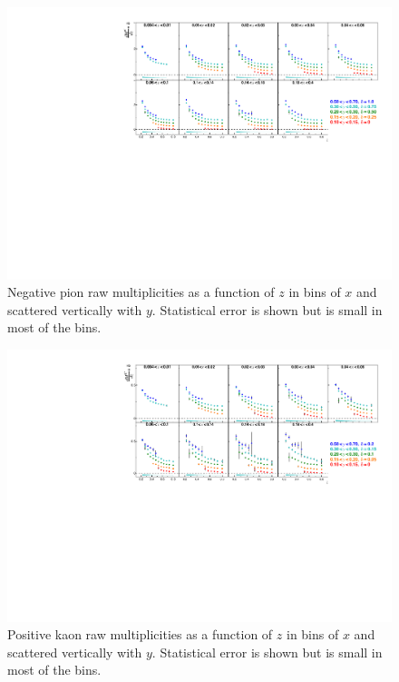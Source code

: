 \begin{figure}[!h]
  \includegraphics[scale=0.85]{./gfx/rawpim.pdf}
  \caption{Negative pion raw multiplicities as a function of $z$ in bins of $x$ and scattered vertically with $y$. Statistical error is shown but is small in most of the bins.}
  \label{pic:rawpim}
\end{figure}

\begin{figure}[!h]
  \includegraphics[scale=0.85]{./gfx/rawkp.pdf}
  \caption{Positive kaon raw multiplicities as a function of $z$ in bins of $x$ and scattered vertically with $y$. Statistical error is shown but is small in most of the bins.}
  \label{pic:rawkp}
\end{figure}

